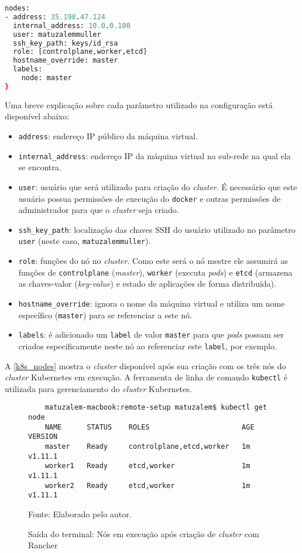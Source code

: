 \begin{lstlisting}[language=Caml,caption=Configuração de nó mestre do \textit{cluster} criado com Rancher,captionpos=t,label=l_rancher_master, numbers=none]
nodes:
- address: 35.198.47.124
  internal_address: 10.0.0.100
  user: matuzalemmuller
  ssh_key_path: keys/id_rsa
  role: [controlplane,worker,etcd]
  hostname_override: master
  labels:
    node: master
}
\end{lstlisting}

Uma breve explicação sobre cada parâmetro utilizado na configuração está disponível abaixo:

\begin{itemize}
    \item \texttt{address}: endereço \ac{IP} público da máquina virtual.
    \item \texttt{internal\_address}: endereço \ac{IP} da máquina virtual na sub-rede na qual ela se encontra.
    \item \texttt{user}: usuário que será utilizado para criação do \textit{cluster}. É necessário que este usuário possua permissões de execução do \texttt{docker} e outras permissões de administrador para que o \textit{cluster} seja criado.
    \item \texttt{ssh\_key\_path}: localização das chaves \ac{SSH} do usuário utilizado no parâmetro \texttt{user} (neste caso, \texttt{matuzalemmuller}).
    \item \texttt{role}: funções do nó no \textit{cluster}. Como este será o nó mestre ele assumirá as funções de \texttt{controlplane} (\textit{master}), \texttt{worker} (executa \textit{pods}) e \texttt{etcd} (armazena as chaves-valor (\textit{key-value}) e estado de aplicações de forma distribuída).
    \item \texttt{hostname\_override}: ignora o nome da máquina virtual e utiliza um nome específico (\texttt{master}) para se referenciar a este nó.
    \item \texttt{labels}: é adicionado um \texttt{label} de valor \texttt{master} para que \textit{pods} possam ser criados especificamente neste nó ao referenciar este \texttt{label}, por exemplo.
\end{itemize}

A \autoref{k8s_nodes} mostra o \textit{cluster} disponível após sua criação com os três nós do \textit{cluster} Kubernetes em execução. A ferramenta de linha de comando \texttt{kubectl} é utilizada para gerenciamento do \textit{cluster} Kubernetes.

\begin{figure}[!htpb]
    \centering
    \caption{Saída do terminal: Nós em execução após criação de \textit{cluster} com Rancher}
\begin{verbatim}
    matuzalem-macbook:remote-setup matuzalem$ kubectl get node
    NAME      STATUS    ROLES                      AGE       VERSION
    master    Ready     controlplane,etcd,worker   1m        v1.11.1
    worker1   Ready     etcd,worker                1m        v1.11.1
    worker2   Ready     etcd,worker                1m        v1.11.1
\end{verbatim}
	Fonte: Elaborado pelo autor.
 	\label{k8s_nodes}
\end{figure}

